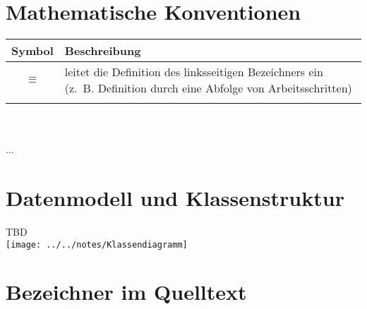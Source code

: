 \documentclass[../main/thesis.tex]{subfiles}
\begin{document}
\chapter{Mathematische Konventionen}
\label{appx:mathsymbols}

%
\begin{tabular}{|c|p{10.5cm}|}
\hline
\textbf{Symbol} & \textbf{Beschreibung} \\
\hline
$\equiv$ & leitet die Definition des linksseitigen Bezeichners ein \newline (z.~B. Definition durch eine Abfolge von Arbeitsschritten) \\
\hline
 &  \\
\hline
\end{tabular}
\\\\
%
...


\chapter{Datenmodell und Klassenstruktur}
\label{appx:fullpage-model}

TBD\\
\texttt{[image: ../../notes/Klassendiagramm]}


\chapter{Bezeichner im Quelltext}
\label{appx:identifiers}
\end{document}
